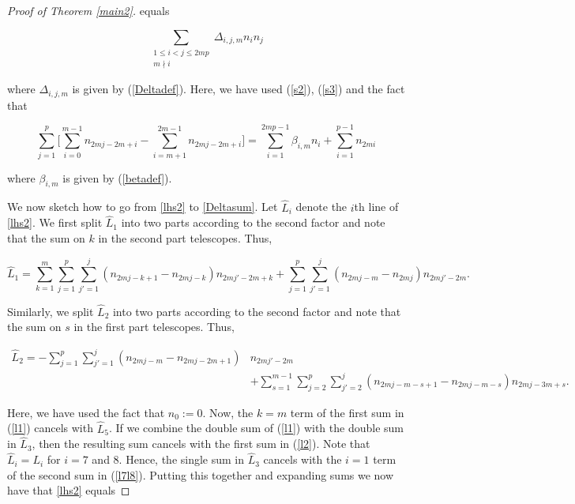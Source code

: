 \documentclass[11pt,reqno]{amsart}
\theoremstyle{definition}
\numberwithin{equation}{section}
\begin{document}
\begin{proof}[Proof of Theorem \ref{main2}]
\noindent equals 

\begin{equation} \label{Deltasum}
\displaystyle \sum_{\substack{1 \leq i < j \leq 2mp \\ m \nmid i}} \Delta_{i,j,m} n_i n_j
\end{equation}

\noindent where $\Delta_{i,j,m}$ is given by (\ref{Deltadef}). Here, we have used (\ref{s2}), (\ref{s3}) and the fact that

\begin{equation}
\sum_{j=1}^{p} \Biggl[ \sum_{i=0}^{m-1} n_{2mj - 2m + i} - \sum_{i=m+1}^{2m-1} n_{2mj-2m+i} \Biggr] = \sum_{i=1}^{2mp-1} \beta_{i,m} n_i + \sum_{i=1}^{p-1} n_{2mi}
\end{equation}

\noindent where $\beta_{i,m}$ is given by (\ref{betadef}).

We now sketch how to go from \eqref{lhs2} to \eqref{Deltasum}.
Let $\hat{L}_i$ denote the $i$th line of \eqref{lhs2}. We first split $\hat{L}_1$ into two parts according to the second factor and note that the sum on $k$ in the second part telescopes. Thus,

\begin{equation} \label{l1}
\hat{L}_1 = \sum_{k=1}^{m} \sum_{j=1}^{p} \sum_{j'=1}^{j} (n_{2mj-k+1} - n_{2mj-k}) n_{2mj' - 2m + k} + \sum_{j=1}^{p} \sum_{j'=1}^{j} (n_{2mj-m} - n_{2mj}) n_{2mj'-2m}.
\end{equation}

\noindent Similarly, we split $\hat{L}_2$ into two parts according to the second factor and note that the sum on $s$ in the first part telescopes. Thus,

\begin{equation} \label{l2}
\begin{aligned}
\hat{L}_2 = - \sum_{j=1}^{p} \sum_{j'=1}^{j}  (n_{2mj-m} - n_{2mj-2m+1}) & n_{2mj' - 2m} \\
& + \sum_{s=1}^{m-1} \sum_{j=2}^{p} \sum_{j'=2}^{j} (n_{2mj-m-s+1} - n_{2mj-m-s}) n_{2mj-3m+s}.
\end{aligned}
\end{equation}

\noindent Here, we have used the fact that $n_0:=0$. Now, the $k=m$ term of the first sum in (\ref{l1}) cancels with $\hat{L}_5$.  If we combine the double sum of (\ref{l1}) with the double sum in $\hat{L}_3$,  then the resulting sum cancels with the first sum in (\ref{l2}).    Note that $\hat{L}_i = L_i$ for $i=7$ and $8$.  Hence, the single sum in $\hat{L}_3$ cancels with the $i=1$ term of the second sum in (\ref{l7l8}). Putting this together and expanding sums we now have that \eqref{lhs2} equals


\end{proof}
\end{document}
